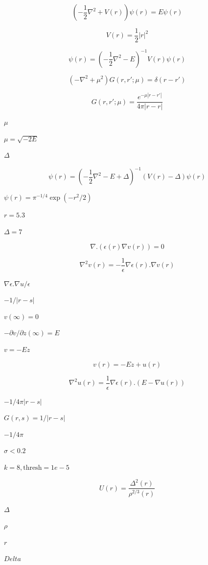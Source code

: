 \documentclass{article}
\begin{document}
\[
\left( -\frac{1}{2} \nabla^2 + V(r) \right) \psi(r) = E \psi(r)
\]
\pagebreak

\[
V(r) = \frac{1}{2} |r|^2
\]
\pagebreak

\[
\psi(r) = \left( -\frac{1}{2} \nabla^2 - E \right)^{-1} V(r) \psi(r)
\]
\pagebreak

\[
\left(-\nabla^2 + \mu^2 \right) G(r,r'; \mu) = \delta(r-r')
\]
\pagebreak

\[
G(r,r'; \mu) = \frac{e^{-\mu |r-r'|}}{4 \pi |r-r|}
\]
\pagebreak

$\mu$
\pagebreak

$\mu = \sqrt{-2 E}$
\pagebreak

$\Delta$
\pagebreak

\[
\psi(r) = \left( -\frac{1}{2} \nabla^2 - E + \Delta \right)^{-1} \left( V(r) -\Delta\right)  \psi(r)
\]
\pagebreak

$\psi(r)=\pi^{-1/4}\exp(-r^2 / 2)$
\pagebreak

$r=5.3$
\pagebreak

$\Delta=7$
\pagebreak

\[
\nabla . \left( \epsilon(r) \nabla v(r)  \right) = 0
\]
\pagebreak

\[
   \nabla^2 v(r) = - \frac{1}{\epsilon} \nabla \epsilon(r) .  \nabla v(r)
\]
\pagebreak

$\nabla \epsilon . \nabla u / \epsilon$
\pagebreak

$-1 / |r-s|$
\pagebreak

$v(\infty)=0$
\pagebreak

$- \partial v / \partial z(\infty) = E$
\pagebreak

$v = - E z$
\pagebreak

\[
v(r) = - E z + u(r)
\]
\pagebreak

\[
   \nabla^2 u(r) = \frac{1}{\epsilon} \nabla \epsilon(r) .  \left(E - \nabla u(r) \right)
\]
\pagebreak

$-1 / 4 \pi |r-s|$
\pagebreak

$G(r,s) = 1/|r-s|$
\pagebreak

$-1/4\pi$
\pagebreak

$\sigma<0.2$
\pagebreak

$k=8, \mbox{thresh}=1e-5$
\pagebreak

\[
U(r) = \frac{\Delta^2 (r)}{\rho^{2/3} (r)}
\]
\pagebreak

$ \Delta $
\pagebreak

$ \rho $
\pagebreak

$ r $
\pagebreak

$ Delta $
\pagebreak
\end{document}
